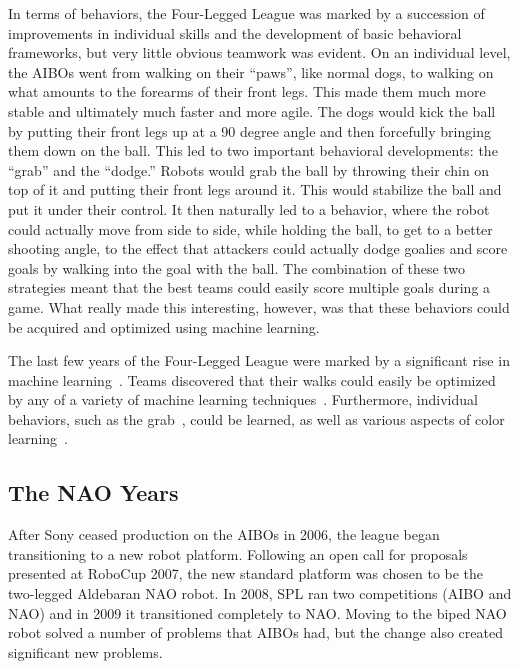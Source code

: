 \documentclass{llncs}
\begin{document}
In terms of behaviors, the Four-Legged League was marked by a succession
of improvements in individual skills and the development of basic behavioral
frameworks, but very little obvious teamwork was evident. On an individual
level, the AIBOs went from walking on their ``paws'', like normal dogs, to walking
on what amounts to the forearms of their front legs. This made them much
more stable and ultimately much faster and more agile.  The dogs would
kick the ball by putting their front legs up at a 90 degree angle and then forcefully bringing
them down on the ball. This led to two important behavioral developments: the
``grab'' and the ``dodge.'' Robots would grab the ball by throwing their
chin on top of it and putting their front legs around it. This would stabilize the
ball and put it under their control. It then naturally led to a behavior, where
the robot could actually move from side to side, while holding the ball, to
get to a better shooting angle, to the effect that attackers could actually dodge
goalies and score goals by walking into the goal with the ball. The combination of these two strategies meant
that the best teams could easily score multiple goals during a game. What really
made this interesting, however, was that these behaviors could be acquired and optimized using machine
learning. 

The last few years of the Four-Legged League were marked by a significant
rise in machine learning~\cite{chalup-07}. Teams discovered that their walks could easily
be optimized by any of a variety of machine learning techniques~\cite{kohl-04,chernova-04}.
Furthermore,
individual behaviors, such as the grab~\cite{fidelman-07}, could be learned, as well as various
aspects of color learning~\cite{quinlan-04}.

\subsection{The NAO Years}

After Sony ceased production on the AIBOs in 2006, the league began
transitioning to a new robot platform. Following an open call for proposals presented at RoboCup 2007, 
the new standard platform was chosen to be the two-legged Aldebaran
NAO robot. In 2008, SPL ran two competitions (AIBO and NAO) and in 2009 it transitioned
completely to NAO. Moving to the biped NAO robot solved a number of
problems that AIBOs had, but the change also created significant new problems.
\end{document}
